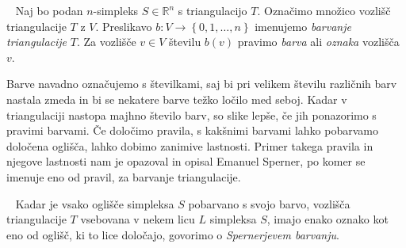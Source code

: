 \documentclass[mat1]{fmfdelo}
\newcommand{\R}{\mathbb R}
\newcommand{\0}{\underline{0}}
\begin{document}
\begin{definicija}~
Naj bo podan $n$-simpleks $S \in \R^n$ s triangulacijo $T$. Označimo množico vozlišč triangulacije $T$ z $V$. Preslikavo $b : V \to \left \{0, 1, \dots, n \right \} $ imenujemo \emph{barvanje triangulacije} $T$. Za vozlišče $v \in V$ številu $b(v)$ pravimo \emph{barva} ali \emph{oznaka} vozlišča $v$.
\end{definicija}
Barve navadno označujemo s številkami, saj bi pri velikem številu različnih barv nastala zmeda in bi se nekatere barve težko ločilo med seboj. Kadar v triangulaciji nastopa majhno število barv, so slike lepše, če jih ponazorimo s pravimi barvami. Če določimo pravila, s kakšnimi barvami lahko pobarvamo določena oglišča, lahko dobimo zanimive lastnosti. Primer takega pravila in njegove lastnosti nam je opazoval in opisal Emanuel Sperner, po komer se imenuje eno od pravil, za barvanje triangulacije.
\begin{definicija}~
Kadar je vsako oglišče simpleksa $S$ pobarvano s svojo barvo, vozlišča triangulacije $T$ vsebovana v nekem licu $L$ simpleksa $S$, imajo enako oznako kot eno od oglišč, ki to lice določajo, govorimo o \emph{Spernerjevem barvanju}.
\end{definicija}
\newcommand*\rows{6}
\newcommand*\vel{1.8}
\end{document}
